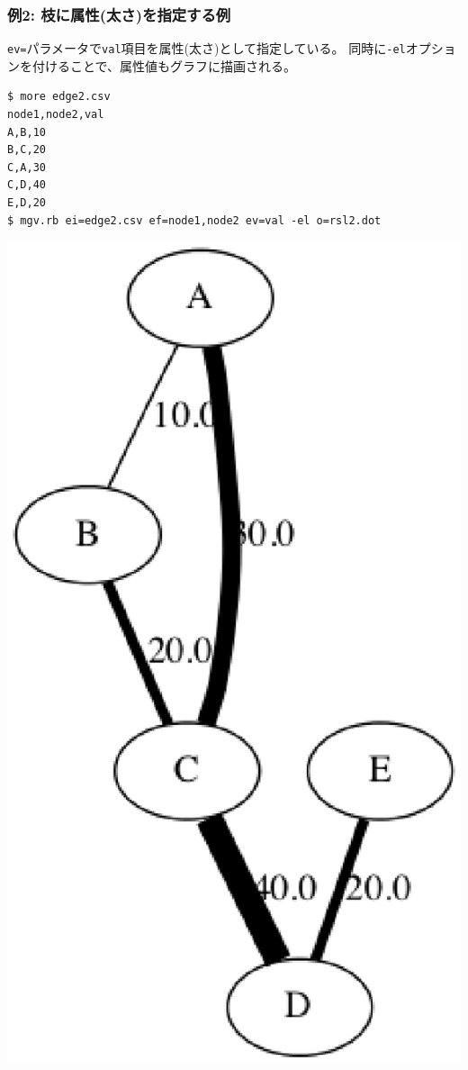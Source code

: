\subsubsection*{例2: 枝に属性(太さ)を指定する例}

\verb|ev=|パラメータで\verb|val|項目を属性(太さ)として指定している。
同時に\verb|-el|オプションを付けることで、属性値もグラフに描画される。


\begin{Verbatim}[baselinestretch=0.7,frame=single]
$ more edge2.csv
node1,node2,val
A,B,10
B,C,20
C,A,30
C,D,40
E,D,20
$ mgv.rb ei=edge2.csv ef=node1,node2 ev=val -el o=rsl2.dot
\end{Verbatim}
\begin{minipage}{1.0\hsize}
\begin{center}
\includegraphics[scale=0.5]{figure/mgv2.eps}
\end{center}
\end{minipage}
